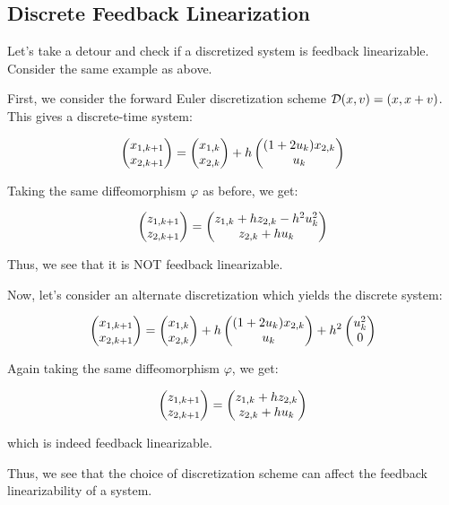 \subsection{Discrete Feedback Linearization}

Let's take a detour and check if a discretized system is feedback linearizable. Consider the same example as above.

First, we consider the forward Euler discretization scheme $\mathcal{D}(x, v) = (x, x + v)$. This gives a discrete-time system:

\begin{equation}
    \begin{pmatrix}x_{1,k+1} \\ x_{2, k+1}\end{pmatrix} = \begin{pmatrix}x_{1,k} \\ x_{2,k}\end{pmatrix} + h\begin{pmatrix}(1+2u_k)x_{2,k} \\ u_k\end{pmatrix}
\end{equation}

Taking the same diffeomorphism $\varphi$ as before, we get:

\begin{equation}
    \begin{pmatrix}z_{1,k+1} \\ z_{2,k+1}\end{pmatrix} = \begin{pmatrix}z_{1,k} + hz_{2,k} - h^2 u_k^2 \\ z_{2,k} + h u_k\end{pmatrix}
\end{equation}

Thus, we see that it is NOT feedback linearizable.

Now, let's consider an alternate discretization which yields the discrete system:

\begin{equation}
    \begin{pmatrix}x_{1,k+1} \\ x_{2, k+1}\end{pmatrix} = \begin{pmatrix}x_{1,k} \\ x_{2,k}\end{pmatrix} + h\begin{pmatrix}(1+2u_k)x_{2,k} \\ u_k\end{pmatrix} + h^2 \begin{pmatrix}u_k^2 \\ 0\end{pmatrix}
\end{equation}

Again taking the same diffeomorphism $\varphi$, we get:

\begin{equation}
    \begin{pmatrix}z_{1,k+1} \\ z_{2,k+1}\end{pmatrix} = \begin{pmatrix}z_{1,k} + hz_{2,k} \\ z_{2,k} + h u_k\end{pmatrix}
\end{equation}

which is indeed feedback linearizable.

Thus, we see that the choice of discretization scheme can affect the feedback linearizability of a system.


